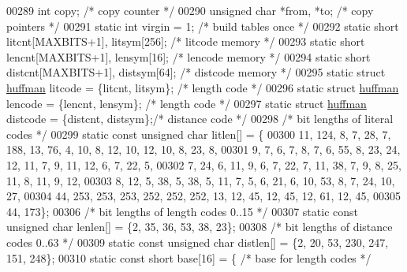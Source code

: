 \begin{DoxyCode}
00289     \textcolor{keywordtype}{int} copy;           \textcolor{comment}{/* copy counter */}
00290     \textcolor{keywordtype}{unsigned} \textcolor{keywordtype}{char} *from, *to;   \textcolor{comment}{/* copy pointers */}
00291     \textcolor{keyword}{static} \textcolor{keywordtype}{int} virgin = 1;                              \textcolor{comment}{/* build tables once */}
00292     \textcolor{keyword}{static} \textcolor{keywordtype}{short} litcnt[MAXBITS+1], litsym[256];        \textcolor{comment}{/* litcode memory */}
00293     \textcolor{keyword}{static} \textcolor{keywordtype}{short} lencnt[MAXBITS+1], lensym[16];         \textcolor{comment}{/* lencode memory */}
00294     \textcolor{keyword}{static} \textcolor{keywordtype}{short} distcnt[MAXBITS+1], distsym[64];       \textcolor{comment}{/* distcode memory */}
00295     \textcolor{keyword}{static} \textcolor{keyword}{struct }\hyperlink{structhuffman}{huffman} litcode = \{litcnt, litsym\};   \textcolor{comment}{/* length code */}
00296     \textcolor{keyword}{static} \textcolor{keyword}{struct }\hyperlink{structhuffman}{huffman} lencode = \{lencnt, lensym\};   \textcolor{comment}{/* length code */}
00297     \textcolor{keyword}{static} \textcolor{keyword}{struct }\hyperlink{structhuffman}{huffman} distcode = \{distcnt, distsym\};\textcolor{comment}{/* distance code */}
00298         \textcolor{comment}{/* bit lengths of literal codes */}
00299     \textcolor{keyword}{static} \textcolor{keyword}{const} \textcolor{keywordtype}{unsigned} \textcolor{keywordtype}{char} litlen[] = \{
00300         11, 124, 8, 7, 28, 7, 188, 13, 76, 4, 10, 8, 12, 10, 12, 10, 8, 23, 8,
00301         9, 7, 6, 7, 8, 7, 6, 55, 8, 23, 24, 12, 11, 7, 9, 11, 12, 6, 7, 22, 5,
00302         7, 24, 6, 11, 9, 6, 7, 22, 7, 11, 38, 7, 9, 8, 25, 11, 8, 11, 9, 12,
00303         8, 12, 5, 38, 5, 38, 5, 11, 7, 5, 6, 21, 6, 10, 53, 8, 7, 24, 10, 27,
00304         44, 253, 253, 253, 252, 252, 252, 13, 12, 45, 12, 45, 12, 61, 12, 45,
00305         44, 173\};
00306         \textcolor{comment}{/* bit lengths of length codes 0..15 */}
00307     \textcolor{keyword}{static} \textcolor{keyword}{const} \textcolor{keywordtype}{unsigned} \textcolor{keywordtype}{char} lenlen[] = \{2, 35, 36, 53, 38, 23\};
00308         \textcolor{comment}{/* bit lengths of distance codes 0..63 */}
00309     \textcolor{keyword}{static} \textcolor{keyword}{const} \textcolor{keywordtype}{unsigned} \textcolor{keywordtype}{char} distlen[] = \{2, 20, 53, 230, 247, 151, 248\};
00310     \textcolor{keyword}{static} \textcolor{keyword}{const} \textcolor{keywordtype}{short} base[16] = \{     \textcolor{comment}{/* base for length codes */}

\end{DoxyCode}

